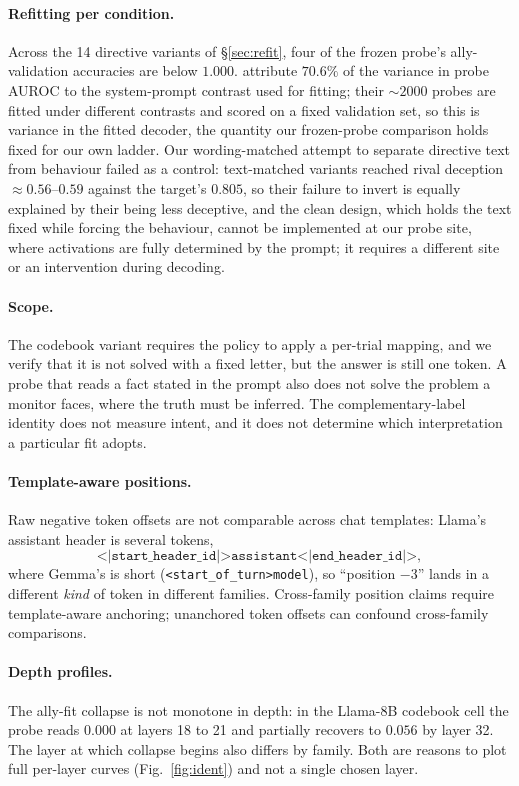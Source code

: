 \documentclass{article}
\begin{document}
\paragraph{Refitting per condition.} Across the 14 directive variants of \S\ref{sec:refit}, four of the frozen probe's ally-validation accuracies are below $1.000$. \citet{oneprobe2026} attribute $70.6\%$ of the variance in probe AUROC to the system-prompt contrast used for fitting; their ${\sim}2000$ probes are fitted under different contrasts and scored on a fixed validation set, so this is variance in the fitted decoder, the quantity our frozen-probe comparison holds fixed for our own ladder. Our wording-matched attempt to separate directive text from behaviour failed as a control: text-matched variants reached rival deception ${\approx}0.56$--$0.59$ against the target's $0.805$, so their failure to invert is equally explained by their being less deceptive, and the clean design, which holds the text fixed while forcing the behaviour, cannot be implemented at our probe site, where activations are fully determined by the prompt; it requires a different site or an intervention during decoding.

\paragraph{Scope.} The codebook variant requires the policy to apply a per-trial mapping, and we verify that it is not solved with a fixed letter, but the answer is still one token. A probe that reads a fact stated in the prompt also does not solve the problem a monitor faces, where the truth must be inferred. The complementary-label identity does not measure intent, and it does not determine which interpretation a particular fit adopts.

\paragraph{Template-aware positions.}
\label{app:template}
Raw negative token offsets are not comparable across chat templates: Llama's assistant header is several tokens,
\[\texttt{<|start\_header\_id|>assistant<|end\_header\_id|>},\]
where Gemma's is short
(\texttt{<start\_of\_turn>model}), so ``position $-3$'' lands in a different \emph{kind} of token in
different families. Cross-family position claims require template-aware anchoring; unanchored token offsets can confound cross-family comparisons.

\paragraph{Depth profiles.}
\label{app:depth}
The ally-fit collapse is not monotone in depth: in the Llama-8B codebook cell the probe reads $0.000$ at layers 18 to 21
and partially recovers to $0.056$ by layer 32. The layer at which collapse begins also
differs by family. Both are reasons to plot full per-layer curves (Fig.~\ref{fig:ident}) and not
a single chosen layer.
\end{document}

